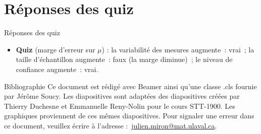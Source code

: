 \documentclass{BeamerTemplate}
\begin{document}
\section{Réponses des quiz}

\begin{frame}[t]{Réponses des quiz}
\footnotesize
\begin{itemize}
\item \textbf{Quiz} (marge d'erreur sur $\mu$) : la variabilité des mesures augmente~: vrai~; la taille d'échantillon augmente~: faux (la marge diminue)~; le niveau de confiance augmente~: vrai.
\end{itemize}

\end{frame}

\begin{frame}{Bibliographie}
 	Ce document est rédigé avec Beamer ainsi qu'une classe .cls fournie par Jérôme Soucy. Les diapositives sont adaptées des diapositives créées par Thierry Duchesne et Emmanuelle Reny-Nolin pour le cours STT-1900. Les graphiques proviennent de ces mêmes diapositives.
 	\printbibliography
 	\vfill
 	\footnotesize Pour signaler une erreur dans ce document, veuillez écrire à l'adresse :~\href{mailto:julien.miron@mat.ulaval.ca}{julien.miron@mat.ulaval.ca}.
 \end{frame}
\end{document}
